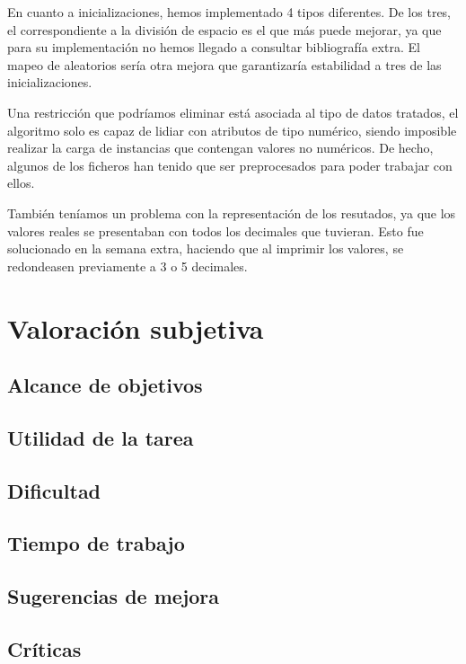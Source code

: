 \documentclass[a4paper]{report}
\begin{document}
	En cuanto a inicializaciones, hemos implementado 4 tipos diferentes. De los tres, el correspondiente a la división de espacio es el que más puede mejorar, ya que para su implementación no hemos llegado a consultar bibliografía extra. El mapeo de aleatorios sería otra mejora que garantizaría estabilidad a tres de las inicializaciones.
	
	Una restricción que podríamos eliminar está asociada al tipo de datos tratados, el algoritmo solo es capaz de lidiar con atributos de tipo numérico, siendo imposible realizar la carga de instancias que contengan valores no numéricos. De hecho, algunos de los ficheros han tenido que ser preprocesados para poder trabajar con ellos.
	
	También teníamos un problema con la representación de los resutados, ya que los valores reales se presentaban con todos los decimales que tuvieran. Esto fue solucionado en la semana extra, haciendo que al imprimir los valores, se redondeasen previamente a 3 o 5 decimales.


\newpage




\newpage


\chapter{Valoración subjetiva}
	
	\section*{Alcance de objetivos}
	
	\section*{Utilidad de la tarea}
	
	\section*{Dificultad}
	
	\section*{Tiempo de trabajo}
	
	\section*{Sugerencias de mejora}
	
	\section*{Críticas}
\end{document}
